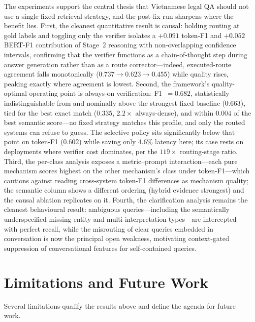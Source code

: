 \documentclass[pdflatex,sn-mathphys-num]{sn-jnl}
\begin{document}
The experiments support the central thesis that Vietnamese legal QA should
not use a single fixed retrieval strategy, and the post-fix run sharpens
where the benefit lies. First, the cleanest quantitative result is causal:
holding routing at gold labels and toggling only the verifier isolates a
$+0.091$ token-F1 and $+0.052$ BERT-F1 contribution of Stage~2 reasoning
with non-overlapping confidence intervals, confirming that the verifier
functions as a chain-of-thought step during answer generation rather than as
a route corrector---indeed, executed-route agreement falls monotonically
($0.737\!\to\!0.623\!\to\!0.455$) while quality rises, peaking exactly where
agreement is lowest. Second, the framework's quality-optimal operating point
is always-on verification: F1~$=0.682$, statistically indistinguishable from
and nominally above the strongest fixed baseline ($0.663$), tied for the
best exact match ($0.335$, $2.2\times$ always-dense), and within $0.004$ of
the best semantic score---no fixed strategy matches this profile, and only
the routed systems can refuse to guess. The selective policy sits
significantly below that point on token-F1 ($0.602$) while saving only
$4.6\%$ latency here; its case rests on deployments where verifier cost
dominates, per the $119\times$ routing-stage ratio. Third, the per-class
analysis exposes a metric--prompt interaction---each pure mechanism scores
highest on the other mechanism's class under token-F1---which cautions
against reading cross-system token-F1 differences as mechanism quality; the
semantic column shows a different ordering (hybrid evidence strongest) and
the causal ablation replicates on it. Fourth, the clarification analysis
remains the cleanest behavioural result: ambiguous queries---including the
semantically underspecified missing-entity and multi-interpretation
types---are intercepted with perfect recall, while the misrouting of clear
queries embedded in conversation is now the principal open weakness,
motivating context-gated suppression of conversational features for
self-contained queries.

\section{Limitations and Future Work}\label{sec:limitations}

Several limitations qualify the results above and define the agenda for future
work.
\end{document}

